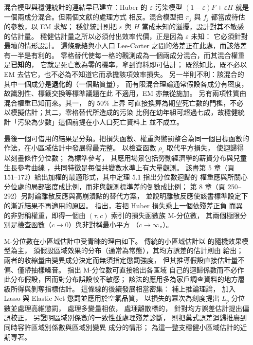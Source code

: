 混合模型與穩健統計的連結早已建立：Huber 的 $\varepsilon$-污染模型
$(1-\varepsilon)F+\varepsilon H$ 就是一個兩成分混合。但兩個文獻的處理方式
相反。混合模型把 $\pi_j$ 與 $f_j$ 都當成待估的參數，以 EM 求解；
穩健統計則把 $\varepsilon$ 與 $H$ 當成未知的滋擾，設計對其不敏感的估計量。
穩健估計量之所以必須付出效率代價，正是因為 $\varepsilon$ 未知：
它必須針對最壞的情形設計。
這條脈絡與小人口 Lee-Carter 之間的落差正在此處，而該落差有一半是有利的。
零格替代使每一格的觀測成為一個兩成分混合，而其混合權重是\textbf{已知的}，
它就是死亡數為零的機率，拿到資料即可估計；
既然如此，既不必以 EM 去估它，也不必為不知道它而承擔該項效率損失。
另一半則不利：該混合的其中一個成分是\textbf{退化的}（一個點質量），
而有限混合理論通常假設各成分有密度，故識別性、標籤交換等標準議題在此
不適用，EM 亦無從施加。
另有兩項性質由混合權重已知而來。其一，\citet{donoho1983} 的 $50\%$ 上界
可直接換算為期望死亡數的門檻，不必以模擬估計；其二，零格替代所造成的污染
比例在幼年組可超過七成，故穩健統計「污染為少數」這個前提在小人口死亡資料上
並不成立。

最後一個可借用的結果是分類。把損失函數、權重與懲罰整合為同一個目標函數的
作法，在小區域估計中發展得最完整。
\citet{koenker1978} 以檢查函數 $\rho_\tau$ 取代平方損失，
使迴歸得以刻畫條件分位數；\citet{koenker2005} 為標準參考，
其應用場景包括勞動經濟學的薪資分布與兒童生長參考曲線
\citep{wei2006}，共同特徵是每個共變數水準上有大量觀測。
該書第 5 章（頁 151--172）給出加權的最適形式，其中定理 5.1 指出分位數迴歸的
權重應與所關心分位處的局部密度成比例，而非與觀測標準差的倒數成比例；
第 8 章（頁 250--292）另討論離散反應與高崩潰點的替代方案，
並說明離散反應使該書標準設定下的漸近結果不再適用的原因。
\citet{breckling1988} 指出，若把 Huber 損失乘上一個依殘差正負
而異的非對稱權重，即得一個由 $(\tau,c)$ 索引的損失函數族 M-分位數，
其兩個極限分別是檢查函數（$c\to0$）與非對稱最小平方
（$c\to\infty$，\citealp{newey1987}）。

M-分位數在小區域估計中受青睞的理由如下。
傳統的小區域估計以 \citet{fay1979} 的隨機效果模型為主，
須假設區域效果的分布（通常為常態），其均方誤差的估計則由
\citet{prasad1990} 給出；兩者的收縮量由變異成分決定而無須指定懲罰強度，
但其推導假設直接估計量不偏、僅帶抽樣噪音。
\citet{chambers2006} 指出 M-分位數可直接給出各區域
自己的迴歸係數而不必作此分布假設，因而對分布誤設較不敏感；
該法的應用多為家戶調查資料的地方層級所得與剝奪指標估計。
這條線的後續發展相當密集：\citet{bianchi2018} 補上推論理論，
\citet{ranalli2023} 加入 Lasso 與 Elastic Net 懲罰並應用於空氣品質，
\citet{hu2021} 以損失的冪次為刻度提出 $L_p$-分位數並處理高維懲罰，
\citet{merlo2022} 處理多變量相依，\citet{dawber2022} 處理離散標的，
\citet{bugallo2026} 針對均方誤差估計提出偏誤校正，
\citet{bugallo2025} 另證明區域別係數的一致性並處理殘差診斷，
\citet{lahiri2023} 則把巢式誤差迴歸推廣到同時容許區域別係數與區域別變異
成分的情形；\citet{jiang2026} 為這一整支穩健小區域估計的近期專著。

